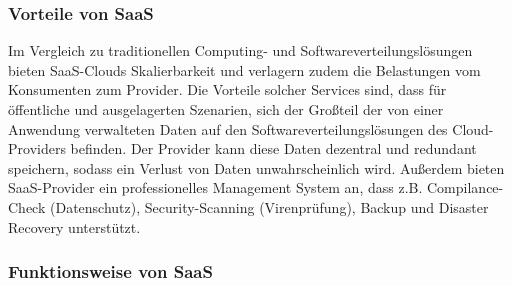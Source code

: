 \subsubsection{Vorteile von SaaS}

Im Vergleich zu traditionellen Computing- und Softwareverteilungslösungen bieten SaaS-Clouds Skalierbarkeit und verlagern zudem die Belastungen vom Konsumenten zum Provider.
Die Vorteile solcher Services sind, dass für öffentliche und ausgelagerten Szenarien, sich der Großteil der von einer Anwendung verwalteten Daten auf den Softwareverteilungslösungen
des Cloud-Providers befinden. Der Provider kann diese Daten dezentral und redundant speichern, sodass ein Verlust von Daten unwahrscheinlich wird. Außerdem bieten SaaS-Provider
ein professionelles Management System an, dass z.B. Compilance-Check (Datenschutz), Security-Scanning (Virenprüfung), Backup und Disaster Recovery unterstützt.

\subsubsection{Funktionsweise von SaaS}

